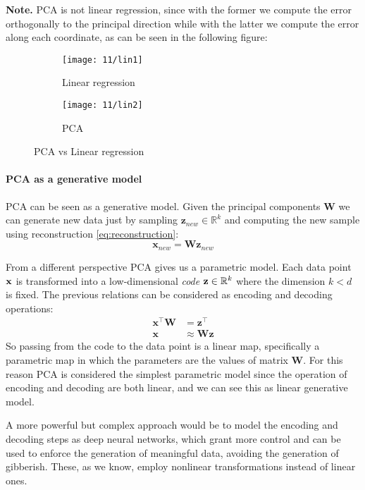 \textbf{Note.} PCA is not linear regression, since with the former we compute the error orthogonally to the principal direction while with the latter we compute the error along each coordinate, as can be seen in the following figure:
\begin{figure}[H]
	\centering
	\begin{subfigure}[t]{0.45\linewidth}
		\centering
		\texttt{[image: 11/lin1]}
		\caption{Linear regression}
	\end{subfigure}
	\hfill
	\begin{subfigure}[t]{0.45\linewidth}
		\centering
		\texttt{[image: 11/lin2]}
		\caption{PCA}
	\end{subfigure}
	\caption{PCA vs Linear regression}
\end{figure}

\paragraph{PCA as a generative model}
PCA can be seen as a generative model. Given the principal components $\mathbf{W}$ we can generate new data just by sampling $\mathbf{z}_{new} \in \mathbb{R}^{k}$ and computing the new sample using reconstruction \cref{eq:reconstruction}:
\begin{equation}
	\mathbf{x}_{new} = \mathbf{W} \mathbf{z}_{new}
\end{equation}

From a different perspective PCA gives us a parametric model. Each data point $\vb{x}$ is transformed into a low-dimensional \emph{code} $\vb{z} \in \mathbb{R}^k$ where the dimension $k < d$ is fixed. The previous relations can be considered as encoding and decoding operations:
\begin{align}
	\mathbf{x}^\top \mathbf{W} &= \mathbf{z}^\top \tag{encoding}\\
	\mathbf{x} &\approx \mathbf{W}\mathbf{z} \tag{decoding}
\end{align}
So passing from the code to the data point is a linear map, specifically a parametric map in which the parameters are the values of matrix $\mathbf{W}$.
For this reason PCA is considered the simplest parametric model since the operation of encoding and decoding are both linear, and we can see this as linear generative model.

A more powerful but complex approach would be to model the encoding and decoding steps as deep neural networks, which grant more control and can be used to enforce the generation of meaningful data, avoiding the generation of gibberish. These, as we know, employ nonlinear transformations instead of linear ones.
